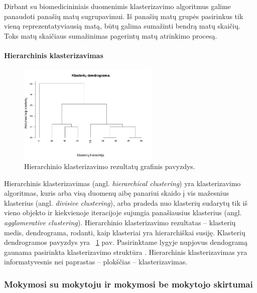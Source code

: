 Dirbant su biomedicininiais duomenimis klasterizavimo algoritmus galime panaudoti panašių matų sugrupavimui. Iš panašių matų grupės pasirinkus tik vieną reprezentatyviausią matą, būtų galima sumažinti bendrą matų skaičių. Toks matų skaičiaus sumažinimas pagerintų matų atrinkimo procesą.

\paragraph{Hierarchinis klasterizavimas}

\begin{figure}
 \centering
 \includegraphics[width=0.6\textwidth]{images/hierarchical_clustering.png}
 \caption{Hierarchinio klasterizavimo rezultatų grafinis pavyzdys.}
 \label{fig:hierarchical_clustering}
\end{figure}
Hierarchinis klasterizavimas (angl. \textit{hierarchical clustering}) yra klasterizavimo algoritmas, kuris arba visą duomenų aibę panariui skaido į vis mažesnius klasterius (angl. \textit{divisive clustering}), arba pradeda nuo klasterių sudarytų tik iš vieno objekto ir kiekvienoje iteracijoje sujungia panašiausius klasterius (angl. \textit{agglomerative clustering}).  Hierarchinio klasterizavimo rezultatas -- klasterių medis, dendrograma, rodanti, kaip klasteriai yra hierarchiškai susiję. Klasterių dendrogramos pavyzdys yra ~\ref{fig:hierarchical_clustering} pav. Pasirinktame lygyje nupjovus dendogramą gaunama pasirinkta klasterizavimo struktūra \cite{martisiute08}. Hierarchinis klasterizavimas yra informatyvesnis nei paprastas -- plokščias -- klasterizavimas.

\subsubsection{Mokymosi su mokytoju ir mokymosi be mokytojo skirtumai}

